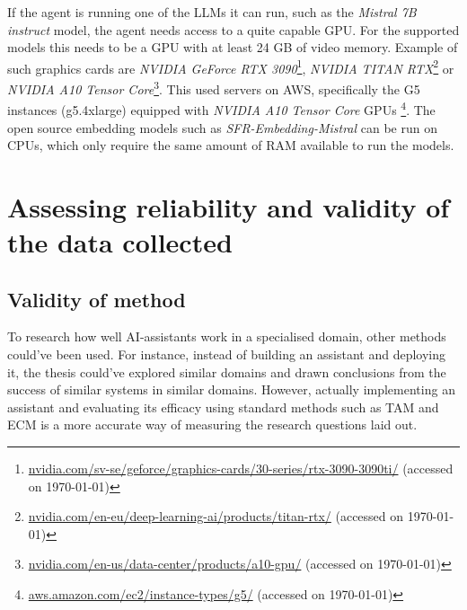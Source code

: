 If the agent is running one of the \gls{LLM}s it can run, such as the \textit{Mistral 7B instruct} model, the agent needs access to a quite capable GPU. For the supported models this needs to be a GPU with at least 24 GB of video memory. Example of such graphics cards are \textit{NVIDIA GeForce RTX 3090}\footnote{\href{https://www.nvidia.com/sv-se/geforce/graphics-cards/30-series/rtx-3090-3090ti/}{nvidia.com/sv-se/geforce/graphics-cards/30-series/rtx-3090-3090ti/} (accessed on \today)}, \textit{NVIDIA TITAN RTX}\footnote{\href{https://www.nvidia.com/en-eu/deep-learning-ai/products/titan-rtx/}{nvidia.com/en-eu/deep-learning-ai/products/titan-rtx/} (accessed on \today)} or \textit{NVIDIA A10 Tensor Core}\footnote{\href{https://www.nvidia.com/en-us/data-center/products/a10-gpu/}{nvidia.com/en-us/data-center/products/a10-gpu/} (accessed on \today)}. This used servers on AWS, specifically the G5 instances (g5.4xlarge) equipped with \textit{NVIDIA A10 Tensor Core} GPUs \footnote{\href{https://aws.amazon.com/ec2/instance-types/g5/}{aws.amazon.com/ec2/instance-types/g5/} (accessed on \today)}. The open source embedding models such as \textit{SFR-Embedding-Mistral} can be run on CPUs, which only require the same amount of RAM available to run the models.


\section{Assessing reliability and validity of the data collected}
\label{sec:assessingReliability}






\subsection{Validity of method}
\label{sec:validtyOfMethod}






To research how well AI-assistants work in a specialised domain, other methods could’ve been used. For instance, instead of building an assistant and deploying it, the thesis could’ve explored similar domains and drawn conclusions from the success of similar systems in similar domains. However, actually implementing an assistant and evaluating its efficacy using standard methods such as \gls{TAM} and \gls{ECM} is a more accurate way of measuring the research questions laid out.


